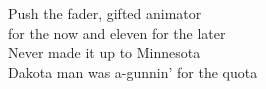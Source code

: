 \songwordfb{} Push the fader, gifted animator \\
 for the now and eleven for the later \\
\songwordfb{} Never made it up to Minnesota \\
 Dakota man was a-gunnin' for the quota \\

